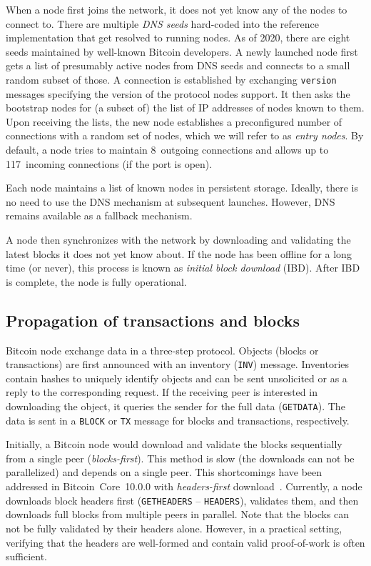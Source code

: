 When a node first joins the network, it does not yet know any of the nodes to connect to.
There are multiple \textit{DNS seeds} hard-coded into the reference implementation that get resolved to running nodes.
As of 2020, there are eight seeds maintained by well-known Bitcoin developers.
A newly launched node first gets a list of presumably active nodes from DNS seeds and connects to a small random subset of those.
A connection is established by exchanging \texttt{version} messages specifying the version of the protocol nodes support.
It then asks the bootstrap nodes for (a subset of) the list of IP addresses of nodes known to them.
Upon receiving the lists, the new node establishes a preconfigured number of connections with a random set of nodes, which we will refer to as \textit{entry nodes}.
By default, a node tries to maintain 8~outgoing connections and allows up to 117~incoming connections (if the port is open).

Each node maintains a list of known nodes in persistent storage.
Ideally, there is no need to use the DNS mechanism at subsequent launches.
However, DNS remains available as a fallback mechanism.

A node then synchronizes with the network by downloading and validating the latest blocks it does not yet know about.
If the node has been offline for a long time (or never), this process is known as \textit{initial block download} (IBD).
After IBD is complete, the node is fully operational.

\subsection{Propagation of transactions and blocks}

Bitcoin node exchange data in a three-step protocol.
Objects (blocks or transactions) are first announced with an inventory (\texttt{INV}) message.
Inventories contain hashes to uniquely identify objects and can be sent unsolicited or as a reply to the corresponding request.
If the receiving peer is interested in downloading the object, it queries the sender for the full data (\texttt{GETDATA}).
The data is sent in a \texttt{BLOCK} or \texttt{TX} message for blocks and transactions, respectively.

Initially, a Bitcoin node would download and validate the blocks sequentially from a single peer (\textit{blocks-first}).
This method is slow (the downloads can not be parallelized) and depends on a single peer.
This shortcomings have been addressed in Bitcoin~Core~10.0.0 with \textit{headers-first} download~\cite{Core2015}.
Currently, a node downloads block headers first (\texttt{GETHEADERS} -- \texttt{HEADERS}), validates them, and then downloads full blocks from multiple peers in parallel.
Note that the blocks can not be fully validated by their headers alone.
However, in a practical setting, verifying that the headers are well-formed and contain valid proof-of-work is often sufficient.

